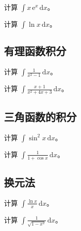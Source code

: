 \documentclass[answers]{kiritex}
\begin{document}
\begin{problem}
  计算 $\displaystyle\int x\,\mathrm{e}^{x}\,\mathrm{d}x$。
\end{problem}

\begin{problem}
  计算 $\displaystyle\int \ln x\,\mathrm{d}x$。
\end{problem}

\subsection{有理函数积分}

\begin{problem}
  计算 $\displaystyle\int \frac{1}{x^2-1}\,\mathrm{d}x$。
\end{problem}

\begin{problem}
  计算 $\displaystyle\int \frac{x+1}{x^2+4x+3}\,\mathrm{d}x$。
\end{problem}

\subsection{三角函数的积分}

\begin{problem}
  计算 $\displaystyle\int \sin^2 x\,\mathrm{d}x$。
\end{problem}

\begin{problem}
  计算 $\displaystyle\int \frac{1}{1+\cos x}\,\mathrm{d}x$。
\end{problem}

\subsection{换元法}

\begin{problem}
  计算 $\displaystyle\int \frac{\ln x}{x}\,\mathrm{d}x$。
\end{problem}

\begin{problem}
  计算 $\displaystyle\int \frac{1}{\sqrt{1-x^2}}\,\mathrm{d}x$。
\end{problem}
\end{document}
